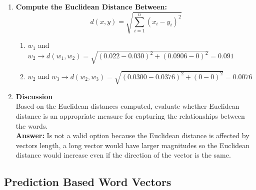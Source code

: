 \documentclass{article}
\begin{document}
\begin{enumerate}

    \item \textbf{Compute the Euclidean Distance Between:}
\[
d(x,y) = \sqrt{\sum_{i=1}^n (x_i - y_i)^2}
\]

    \begin{enumerate}
        \item $w_1$ and $ w_2 \rightarrow 
	d(w_1, w_2) = \sqrt{(0.022 - 0.030)^2 + (0.0906 - 0)^2} = 0.091$
        \item $w_2 $ and $ w_3 \rightarrow
	d(w_2, w_3) = \sqrt{(0.0300 - 0.0376)^2 + (0 - 0)^2} = 0.0076$
    \end{enumerate}
    
    \item \textbf{Discussion} \\
    Based on the Euclidean distances computed, evaluate whether Euclidean distance is an appropriate measure for capturing the relationships between the words.\\
	\textbf{Answer:} Is not a valid option because the Euclidean distance is affected by vectors length, a long vector would have larger magnitudes so the Euclidean distance would increase even if the direction of the vector is the same.
\end{enumerate}
	\subsection { Prediction Based Word Vectors }
\end{document}
